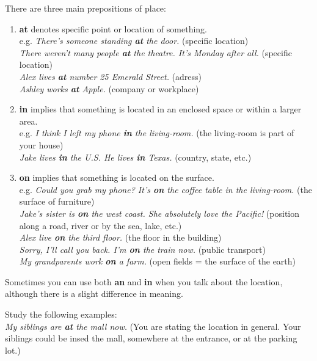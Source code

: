 \documentclass[hidelinks,10pt,a4paper]{article}
\begin{document}
There are three main prepositions of place:
\begin{enumerate}[label=(\alph*)]
	\item \textbf{at} denotes specific point or location of something. \\
		e.g. \textit{There's someone standing \textbf{at} the door.} (specific location)\\
		\textit{There weren't many people \textbf{at} the theatre. It's Monday after all.} (specific location)\\
		\textit{Alex lives \textbf{at} number 25 Emerald Street.} (adress)\\
		\textit{Ashley works \textbf{at} Apple.} (company or workplace)
	\item \textbf{in} implies that something is located in an enclosed space or within a larger area.\\
		e.g. \textit{I think I left my phone \textbf{in} the living-room.} (the living-room is part of your house)\\
		\textit{Jake lives \textbf{in} the U.S. He lives \textbf{in} Texas.} (country, state, etc.) \\
	\item \textbf{on} implies that something is located on the surface. \\
		e.g. \textit{Could you grab my phone? It's \textbf{on} the coffee table in the living-room.} (the surface of furniture)\\
		\textit{Jake's sister is \textbf{on} the west coast. She absolutely love the Pacific!} (position along a road, river or by the sea, lake, etc.) \\
		\textit{Alex live \textbf{on} the third floor. } (the floor in the building) \\
		\textit{Sorry, I'll call you back. I'm \textbf{on} the train now.} (public transport) \\
		\textit{My grandparents work \textbf{on} a farm.} (open fields = the surface of the earth)
\end{enumerate}

Sometimes you can use both \textbf{an} and \textbf{in} when you talk about the location, although there is a slight difference in meaning.

Study the following examples:\\

\textit{My siblings are \textbf{at} the mall now.} (You are stating the location in general. Your siblings could be insed the mall, somewhere at the entrance, or at the parking lot.)\\
\end{document}
